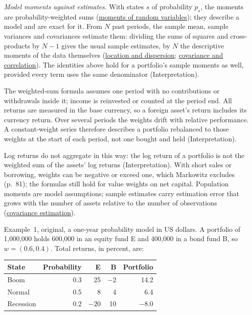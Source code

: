 \begin{qfmethod}
\emph{Model moments against estimates.} With states $s$ of probability $p_s$, the moments are probability-weighted sums (\hyperref[def:conditional-moments]{moments of random variables}); they describe a model and are exact for it. From $N$ past periods, the sample mean, sample variances and covariances estimate them: dividing the sums of squares and cross-products by $N-1$ gives the usual sample estimates, by $N$ the descriptive moments of the data themselves (\hyperref[def:return-sample-statistics]{location and dispersion}; \hyperref[def:return-dependence]{covariance and correlation}). The identities above hold for a portfolio's sample moments as well, provided every term uses the same denominator (Interpretation).

 The weighted-sum formula assumes one period with no contributions or withdrawals inside it; income is reinvested or counted at the period end. All returns are measured in the base currency, so a foreign asset's return includes its currency return. Over several periods the weights drift with relative performance. A constant-weight series therefore describes a portfolio rebalanced to those weights at the start of each period, not one bought and held (Interpretation).

Log returns do not aggregate in this way: the log return of a portfolio is not the weighted sum of the assets' log returns (Interpretation). With short sales or borrowing, weights can be negative or exceed one, which Markowitz excludes (p.~81); the formulas still hold for value weights on net capital. Population moments are model assumptions; sample estimates carry estimation error that grows with the number of assets relative to the number of observations (\hyperref[meth:portfolio-covariance-estimation]{covariance estimation}).

 Example~1, original, a one-year probability model in US dollars. A portfolio of 1{,}000{,}000 holds 600{,}000 in an equity fund E and 400{,}000 in a bond fund B, so $w=(0.6,0.4)$. Total returns, in percent, are:

\begin{center}\small
\begin{tabular}{@{}lrrrr@{}}
\toprule
State & Probability & E & B & Portfolio \\
\midrule
Boom & 0.3 & 25 & $-2$ & 14.2 \\
Normal & 0.5 & 8 & 4 & 6.4 \\
Recession & 0.2 & $-20$ & 10 & $-8.0$ \\
\bottomrule
\end{tabular}
\end{center}


\end{qfmethod}
